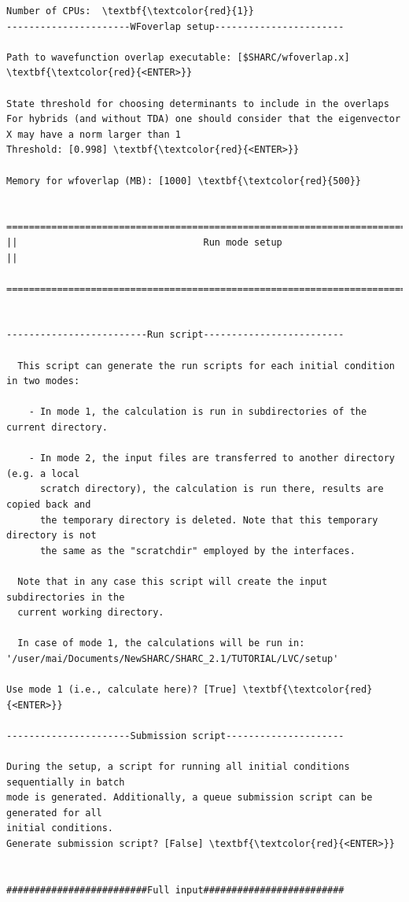 \documentclass[a4paper,11pt,DIV=15,openany]{scrbook}
\begin{document}
\begin{oframed}
\begin{Verbatim}[commandchars=\\\{\}]
Number of CPUs:  \textbf{\textcolor{red}{1}}
----------------------WFoverlap setup-----------------------

Path to wavefunction overlap executable: [$SHARC/wfoverlap.x] \textbf{\textcolor{red}{<ENTER>}}

State threshold for choosing determinants to include in the overlaps
For hybrids (and without TDA) one should consider that the eigenvector X may have a norm larger than 1
Threshold: [0.998] \textbf{\textcolor{red}{<ENTER>}}

Memory for wfoverlap (MB): [1000] \textbf{\textcolor{red}{500}}

  ================================================================================
||                                 Run mode setup                                 ||
  ================================================================================


-------------------------Run script-------------------------

  This script can generate the run scripts for each initial condition in two modes:

    - In mode 1, the calculation is run in subdirectories of the current directory.

    - In mode 2, the input files are transferred to another directory (e.g. a local
      scratch directory), the calculation is run there, results are copied back and
      the temporary directory is deleted. Note that this temporary directory is not
      the same as the "scratchdir" employed by the interfaces.

  Note that in any case this script will create the input subdirectories in the
  current working directory.

  In case of mode 1, the calculations will be run in:
'/user/mai/Documents/NewSHARC/SHARC_2.1/TUTORIAL/LVC/setup'

Use mode 1 (i.e., calculate here)? [True] \textbf{\textcolor{red}{<ENTER>}}

----------------------Submission script---------------------

During the setup, a script for running all initial conditions sequentially in batch
mode is generated. Additionally, a queue submission script can be generated for all
initial conditions.
Generate submission script? [False] \textbf{\textcolor{red}{<ENTER>}}


#########################Full input#########################


\end{Verbatim}
\end{oframed}
\end{document}
